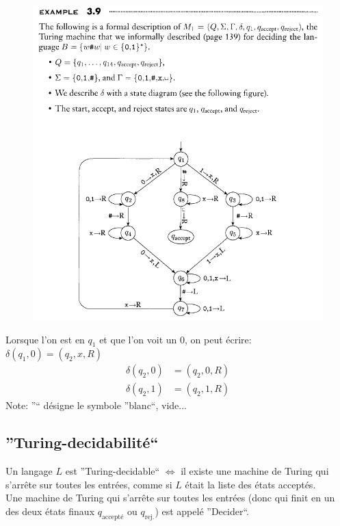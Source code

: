 \documentclass[a4paper,12pt]{article}
\begin{document}
  \begin{center}
    \begin{figure}[h]
      \includegraphics[scale=0.5]{./Cours2_Ex3_9.jpg}
    \end{figure}
  \end{center}

  Lorsque l'on est en $q_1$ et que l'on voit un 0, on peut écrire: $\delta(q_1, 0) = (q_2, x, R)$\\
  \begin{align*}
    \delta(q_2, 0) &= (q_2, 0, R)\\
    \delta(q_2, 1) &= (q_2, 1, R)
  \end{align*}
  Note: ''\textvisiblespace`` désigne le symbole ''blanc``, vide...

  \subsection{''Turing-decidabilité``}
    Un langage $L$ est ''Turing-decidable`` $\Leftrightarrow$ il existe une machine de Turing qui s'arrête sur toutes les entrées, comme si $L$ était la liste des états acceptés.\\
    Une machine de Turing qui s'arrête sur toutes les entrées (donc qui finit en un des deux états finaux $q_{\text{accepté}}$ ou $q_{\text{rej.}}$) est appelé ''Decider``.
\end{document}
